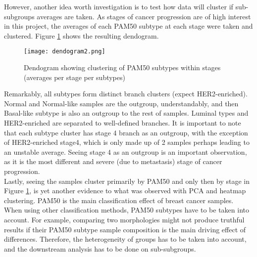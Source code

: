     \newpage
    However, another idea worth investigation is to test how data will cluster if sub-subgroups averages are taken. As stages of cancer progression are of high interest in this project, the averages of each PAM50 subtype at each stage were taken and clustered. Figure \ref{fig:dendogram} shows the resulting dendogram. 
    
            \begin{figure}[!h]
            \centering
            \texttt{[image: dendogram2.png]}
            \caption{Dendogram showing clustering of PAM50 subtypes within stages (averages per stage per subtypes)}
            \label{fig:dendogram}
            \end{figure}
    
    Remarkably, all subtypes form distinct branch clusters (expect HER2-enriched). Normal and Normal-like samples are the outgroup, understandably, and then Basal-like subtype is also an outgroup to the rest of samples. Luminal types and HER2-enriched are separated to well-defined branches. It is important to note that each subtype cluster has stage 4 branch as an outgroup, with the exception of HER2-enriched stage4, which is only made up of 2 samples perhaps leading to an unstable average. Seeing stage 4 as an outgroup is an important observation, as it is the most different and severe (due to metastasis) stage of cancer progression. \\
    
    Lastly, seeing the samples cluster primarily by PAM50 and only then by stage in Figure \ref{fig:dendogram}, is yet another evidence to what was observed with PCA and heatmap clustering. PAM50 is the main classification effect of breast cancer samples. When using other classification methods, PAM50 subtypes have to be taken into account. For example, comparing two morphologies might not produce truthful results if their PAM50 subtype sample composition is the main driving effect of differences. Therefore, the heterogeneity of groups has to be taken into account, and the downstream analysis has to be done on sub-subgroups.  
    
     





